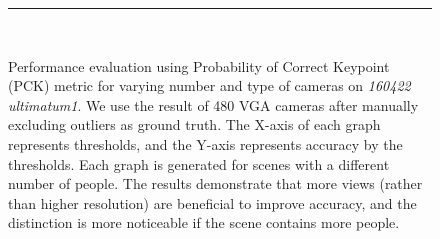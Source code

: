 \begin{figure}[t]
{{{				\rule{0ex}{3ex}
			}
			\rule{1ex}{0ex}
		}	
	}
	\\
	\caption{Performance evaluation using Probability of Correct Keypoint (PCK) metric for varying number and type of cameras on \emph{160422 ultimatum1}. We use the result of 480 VGA cameras after manually excluding outliers as ground truth. The X-axis of each graph represents thresholds, and the Y-axis represents accuracy by the thresholds. Each graph is generated for scenes with a different number of people. The results demonstrate that more views (rather than higher resolution) are beneficial to improve accuracy, and the distinction is more noticeable if the scene contains more people.} 
	\label{fig:quant1}
\end{figure}

%		
%	

